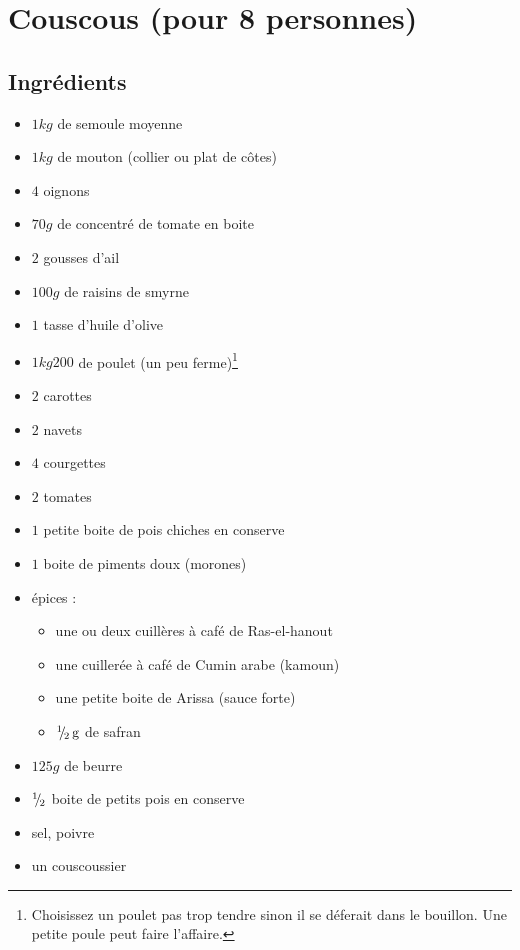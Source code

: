 \newpage
\section{Couscous (pour 8 personnes)}
\subsection*{Ingrédients}
\begin{itemize}
\item $1\unit{kg}$ de semoule moyenne
\item $1\unit{kg}$ de mouton (collier ou plat de côtes)
\item $4$ oignons
\item $70\unit{g}$ de concentré de tomate en boite
\item $2$ gousses d'ail
\item $100\unit{g}$ de raisins de smyrne
\item $1$ tasse d'huile d'olive
\item $1\unit{kg} 200$ de poulet (un peu ferme)\footnote{Choisissez un poulet pas trop tendre sinon il se déferait dans le bouillon. Une petite poule peut faire l'affaire.}
\item $2$ carottes
\item $2$ navets
\item $4$ courgettes
\item $2$ tomates
\item $1$ petite boite de pois chiches en conserve
\item $1$ boite de piments doux (morones)
\item épices : \begin{itemize}
		\item une ou deux cuillères à café de Ras-el-hanout
		\item une cuillerée à café de Cumin arabe (kamoun)
		\item une petite boite de Arissa (sauce forte)
		\item ${{}^{1\!\!}/ _{\!2}}\mathrm{\thinspace g}$ de safran
		\end{itemize}
\item $125\unit{g}$ de beurre
\item ${{}^{1\!\!}/ _{\!2}}$ boite de petits pois en conserve
\item sel, poivre
\item un couscoussier
\end{itemize}
